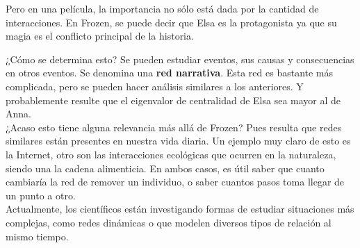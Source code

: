\documentclass[12pt]{extreport}
\begin{document}
	Pero en una película, la importancia no sólo está dada por la cantidad de 
	interacciones. En Frozen, se puede decir que Elsa es la protagonista ya que 
	su magia es el conflicto principal de la historia. 
	
	¿Cómo se determina esto? Se pueden estudiar eventos, sus causas y  
	consecuencias en otros eventos. Se denomina una \textbf{red narrativa}.
	Esta red es bastante más complicada, pero se pueden hacer análisis similares
	a los anteriores. Y probablemente resulte que el eigenvalor de centralidad 
	de Elsa sea mayor al de Anna.
	\\
	
	¿Acaso esto tiene alguna relevancia más allá de Frozen?
	Pues resulta que redes similares están presentes en nuestra vida diaria.
	Un ejemplo muy claro de esto es la Internet,
	otro son las interacciones ecológicas que ocurren en la naturaleza, 
	siendo una la cadena alimenticia.
	En ambos casos, es útil saber que cuanto cambiaría la red de remover un 
	individuo, o saber cuantos pasos toma llegar de un punto a otro.
	\\
	
	Actualmente, los científicos están investigando formas de estudiar 
	situaciones más complejas, como redes dinámicas o  que modelen diversos tipos de relación al mismo tiempo. 
\end{document}
